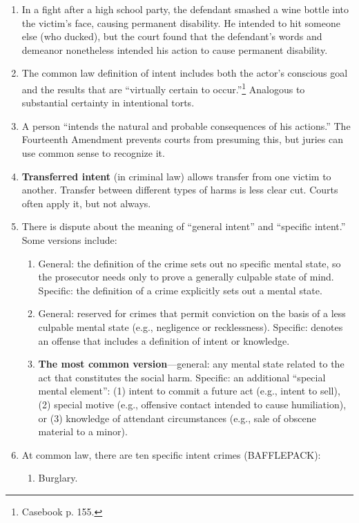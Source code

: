 \begin{enumerate}
    \item In a fight after a high school party, the defendant smashed a wine bottle into the victim's face, causing permanent disability. He intended to hit someone else (who ducked), but the court found that the defendant's words and demeanor nonetheless intended his action to cause permanent disability.
    \item The common law definition of intent includes both the actor's conscious goal and the results that are ``virtually certain to occur.''\footnote{Casebook p. 155.} Analogous to substantial certainty in intentional torts.
    \item A person ``intends the natural and probable consequences of his actions.'' The Fourteenth Amendment prevents courts from presuming this, but juries can use common sense to recognize it.
    \item \textbf{Transferred intent} (in criminal law) allows transfer from one victim to another. Transfer between different types of harms is less clear cut. Courts often apply it, but not always.
    \item There is dispute about the meaning of ``general intent'' and ``specific intent.'' Some versions include:
    \begin{enumerate}
        \item General: the definition of the crime sets out no specific mental state, so the prosecutor needs only to prove a generally culpable state of mind. Specific: the definition of a crime explicitly sets out a mental state.
        \item General: reserved for crimes that permit conviction on the basis of a less culpable mental state (e.g., negligence or recklessness). Specific: denotes an offense that includes a definition of intent or knowledge.
        \item \textbf{The most common version}---general: any mental state related to the act that constitutes the social harm. Specific: an additional ``special mental element'': (1) intent to commit a future act (e.g., intent to sell), (2) special motive (e.g., offensive contact intended to cause humiliation), or (3) knowledge of attendant circumstances (e.g., sale of obscene material to a minor).
    \end{enumerate}
    \item At common law, there are ten specific intent crimes (BAFFLEPACK):
    \begin{enumerate}
        \item Burglary.

\end{enumerate}
\end{enumerate}
